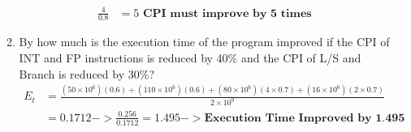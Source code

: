 \documentclass[10pt]{article}
\begin{document}
\begin{enumerate}
\begin{enumerate}
\begin{align*}
            \frac{4}{0.8} &= 5 \textbf{ CPI must improve by 5 times}
        \end{align*}
        \item
        By how much is the execution time of the program improved if the CPI of INT and FP instructions is reduced by 40\% and the CPI of L/S and Branch is reduced by 30\%?
        \begin{align*}
            E_t &= \frac{(50 \times 10^6)(0.6) + (110 \times 10^6)(0.6) + (80 \times 10^6)(4 \times 0.7) + (16 \times 10^6)(2 \times 0.7)}{2 \times 10^9}\\
            &= 0.1712 -> \frac{0.256}{0.1712} = 1.495 -> \textbf{Execution Time Improved by 1.495}\\
        \end{align*}
    \end{enumerate}
\end{enumerate}
\end{document}
